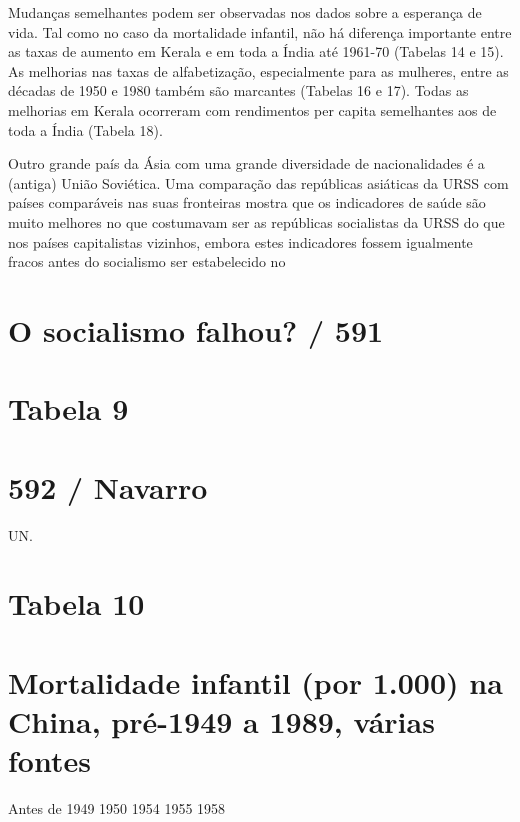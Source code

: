 {{{ \par 
Mudanças semelhantes podem ser observadas nos dados sobre a esperança de vida. Tal como no caso da mortalidade infantil, não há diferença importante entre as taxas de aumento em Kerala e em toda a Índia até 1961-70 (Tabelas {\color{blue}14} e {\color{blue}15}). As melhorias nas taxas de alfabetização, especialmente para as mulheres, entre as décadas de 1950 e 1980 também são marcantes (Tabelas {\color{blue}16} e {\color{blue}17}). Todas as melhorias em Kerala ocorreram com rendimentos per capita semelhantes aos de toda a Índia (Tabela {\color{blue}18}).
 \par 
Outro grande país da Ásia com uma grande diversidade de nacionalidades é a (antiga) União Soviética. Uma comparação das repúblicas asiáticas da URSS com países comparáveis ​​nas suas fronteiras mostra que os indicadores de saúde são muito melhores no que costumavam ser as repúblicas socialistas da URSS do que nos países capitalistas vizinhos, embora estes indicadores fossem igualmente fracos antes do socialismo ser estabelecido no
 \par 
\section{O socialismo falhou? / 591}
 \par 
\section{Tabela 9}
 \par 
\section{592 / Navarro}
 \par 
UN.
 \par 
\section{Tabela 10}
 \par 
\section{Mortalidade infantil (por 1.000) na China, pré-1949 a 1989, várias fontes}
 \par 
Antes de 1949 1950 1954 1955 1958
 \par 
}}}

